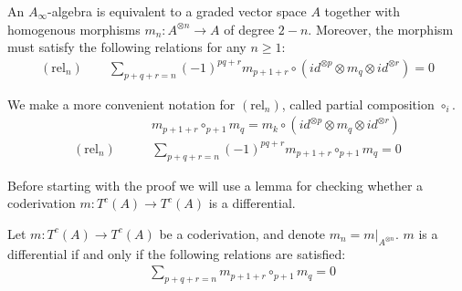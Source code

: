 \documentclass[../thesis.tex]{subfiles}
\begin{document}
        \begin{proposition}\label{prop: A-infinity def}
            An $A_\infty$-algebra is equivalent to a graded vector space $A$ together with homogenous morphisms $m_n:A^{\otimes n}\rightarrow A$ of degree $2-n$. Moreover, the morphism must satisfy the following relations for any $n\geq 1$:
            \begin{align*}
                (\text{rel}_n)\qquad \sum_{p+q+r = n}(-1)^{pq+r}m_{p+1+r}\circ (id^{\otimes p}\otimes m_q \otimes id^{\otimes r}) = 0
            \end{align*}
        \end{proposition}

        \begin{remark}
            We make a more convenient notation for $(\text{rel}_n)$, called partial composition $\circ_i$.
            \begin{align*}
                & m_{p+1+r} \circ_{p+1} m_q = m_k \circ (id^{\otimes p}\otimes m_q \otimes id^{\otimes r}) \\
                (\text{rel}_n)\qquad & \sum_{p+q+r = n} (-1)^{pq+r} m_{p+1+r} \circ_{p+1} m_q = 0
            \end{align*}
        \end{remark}

        Before starting with the proof we will use a lemma for checking whether a coderivation $m: T^c(A) \rightarrow T^c(A)$ is a differential.

        \begin{lemma}\label{lem: coderivation-is-diff?}
            Let $m: T^c(A) \rightarrow T^c(A)$ be a coderivation, and denote $m_n = m|_{A^{\otimes n}}$. $m$ is a differential if and only if the following relations are satisfied:
            \begin{align*}
                & \sum_{p+q+r = n}m_{p+1+r}\circ_{p+1}m_q = 0
            \end{align*}
        \end{lemma}
\end{document}
